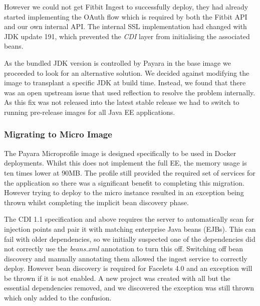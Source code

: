         \par
        However we could not get Fitbit Ingest to successfully deploy, they had already started implementing the OAuth flow which is required by both the Fitbit API and our own internal API. The internal SSL implementation had changed with JDK update 191, which prevented the \textit{CDI} layer from initialising the associated beans.

        \par
        As the bundled JDK version is controlled by Payara in the base image we proceeded to look for an alternative solution. We decided against modifying the image to transplant a specific JDK at build time. Instead, we found that there was an open upstream issue\cite{payara_ssl_issue} that used reflection to resolve the problem internally. As this fix was not released into the latest stable release we had to switch to running pre-release images for all Java EE applications.

        \subsubsection{Migrating to Micro Image}
        \par
        The Payara Microprofile image is designed specifically to be used in Docker deployments. Whilst this does not implement the full EE, the memory usage is ten times lower at 90MB. The profile still provided the required set of services for the application so there was a significant benefit to completing this migration. However trying to deploy to the micro instance resulted in an exception being thrown whilst completing the implicit bean discovery phase. 

        \par
        The CDI 1.1 specification and above requires the server to automatically scan for injection points and pair it with matching enterprise Java beans (EJBs). This can fail with older dependencies, so we initially suspected one of the dependencies did not correctly use the \textit{beans.xml} annotation to turn this off.
        \newline
        Switching off bean discovery and manually annotating them allowed the ingest service to correctly deploy. However bean discovery is required for Facelets 4.0 and an exception will be thrown if it is not enabled. A new project was created with all but the essential dependencies removed, and we discovered the exception was still thrown which only added to the confusion. 
        
